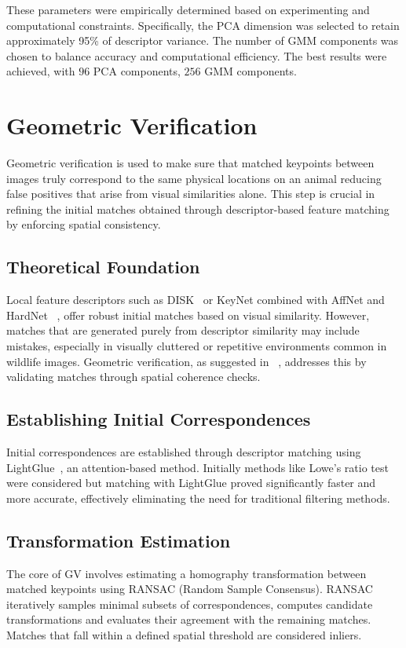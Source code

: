 These parameters were empirically determined based on experimenting and computational constraints. Specifically, the PCA dimension was selected to retain approximately 95\% of descriptor variance. The number of GMM components was chosen to balance accuracy and computational efficiency. The best results were achieved, with $96$ PCA components, $256$ GMM components.

\section{Geometric Verification}
\label{sec:geometric_verification}
Geometric verification is used to make sure that matched keypoints between images truly correspond to the same physical locations on an animal reducing false positives that arise from visual similarities alone. This step is crucial in refining the initial matches obtained through descriptor-based feature matching by enforcing spatial consistency.~\cite{springerSpeciesAgnosticPatterned}

\subsection{Theoretical Foundation}
Local feature descriptors such as DISK~\cite{tyszkiewicz2020disklearninglocalfeatures} or KeyNet combined with AffNet and HardNet ~\cite{keynet, mishkin2018repeatabilityenoughlearningaffine, Mishchuk2017HardNet}, offer robust initial matches based on visual similarity. However, matches that are generated purely from descriptor similarity may include mistakes, especially in visually cluttered or repetitive environments common in wildlife images. Geometric verification, as suggested in ~\cite{springerSpeciesAgnosticPatterned}, addresses this by validating matches through spatial coherence checks. 

\subsection{Establishing Initial Correspondences}
Initial correspondences are established through descriptor matching using LightGlue~\cite{lindenberger2023lightgluelocalfeaturematching}, an attention-based method. Initially methods like Lowe's ratio test were considered but matching with LightGlue proved significantly faster and more accurate, effectively eliminating the need for traditional filtering methods.

\subsection{Transformation Estimation}
The core of GV involves estimating a homography transformation between matched keypoints using RANSAC (Random Sample Consensus). RANSAC iteratively samples minimal subsets of correspondences, computes candidate transformations and evaluates their agreement with the remaining matches. Matches that fall within a defined spatial threshold are considered inliers. 


